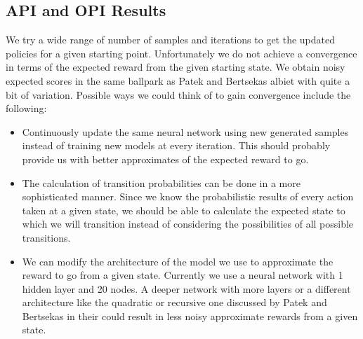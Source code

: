 \documentclass[11pt, oneside]{article}   	%
\begin{document}
\subsection{API and OPI Results}
We try a wide range of number of samples and iterations to get the updated policies for a given starting point. Unfortunately we do not achieve a convergence in terms of the expected reward from the given starting state. We obtain noisy expected scores in the same ballpark as Patek and Bertsekas albiet with quite a bit of variation.
Possible ways we could think of to gain convergence include the following:
\begin{itemize}
	\item Continuously update the same neural network using new generated samples instead of training new models at every iteration. This should probably provide us with better approximates of the expected reward to go.
	\item The calculation of transition probabilities can be done in a more sophisticated manner. Since we know the probabilistic results of every action taken at a given state, we should be able to calculate the expected state to which we will transition instead of considering the possibilities of all possible transitions.
	\item We can modify the architecture of the model we use to approximate the reward to go from a given state. Currently we use a neural network with 1 hidden layer and 20 nodes. A deeper network with more layers or a different architecture like the quadratic or recursive one discussed by Patek and Bertsekas in their could result in less noisy approximate rewards from a given state.
\end{itemize}
\end{document}
